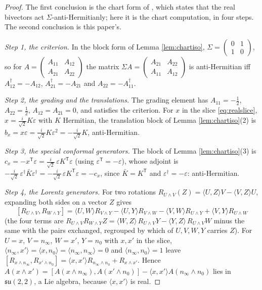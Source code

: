 \documentclass[11pt]{article}
\theoremstyle{definition}
\newcommand{\ip}[2]{\langle #1, #2\rangle}
\begin{document}
\begin{proof}
The first conclusion is the chart form of \cite[Prop.~4.5(2)]{ButlerT9}, which states that the real bivectors act $\Sigma$-anti-Hermitianly; here it is the chart computation, in four steps. The second conclusion is this paper's.

\emph{Step 1, the criterion.} In the block form of Lemma \ref{lem:chartiso}, $\Sigma = \left(\begin{smallmatrix} 0 & 1 \\ 1 & 0\end{smallmatrix}\right)$, so for $A = \left(\begin{smallmatrix} A_{11} & A_{12} \\ A_{21} & A_{22}\end{smallmatrix}\right)$ the matrix $\Sigma A = \left(\begin{smallmatrix} A_{21} & A_{22} \\ A_{11} & A_{12}\end{smallmatrix}\right)$ is anti-Hermitian iff $A_{12}^{\dagger} = -A_{12}$, $A_{21}^{\dagger} = -A_{21}$ and $A_{22} = -A_{11}^{\dagger}$.

\emph{Step 2, the grading and the translations.} The grading element has $A_{11} = -\tfrac12$, $A_{22} = \tfrac12$, $A_{12} = A_{21} = 0$, and satisfies the criterion. For $x$ in the slice \eqref{eq:realslice}, $x = \tfrac{i}{\sqrt2}K\varepsilon$ with $K$ Hermitian, the translation block of Lemma \ref{lem:chartiso}(2) is $b_{x} = x\varepsilon = \tfrac{i}{\sqrt2}K\varepsilon^{2} = -\tfrac{i}{\sqrt2}K$, anti-Hermitian.

\emph{Step 3, the special conformal generators.} The block of Lemma \ref{lem:chartiso}(3) is $c_{x} = -x^{\mathsf T}\varepsilon = \tfrac{i}{\sqrt2}\,\varepsilon K^{\mathsf T}\varepsilon$ (using $\varepsilon^{\mathsf T} = -\varepsilon$), whose adjoint is $-\tfrac{i}{\sqrt2}\,\varepsilon^{\dagger}\bar{K}\varepsilon^{\dagger} = -\tfrac{i}{\sqrt2}\,\varepsilon K^{\mathsf T}\varepsilon = -c_{x}$, since $\bar K = K^{\mathsf T}$ and $\varepsilon^{\dagger} = -\varepsilon$: anti-Hermitian.

\emph{Step 4, the Lorentz generators.} For two rotations $R_{U\wedge V}(Z) = \ip{U}{Z}V - \ip{V}{Z}U$, expanding both sides on a vector $Z$ gives
\[
[R_{U\wedge V}, R_{W\wedge Y}] = \ip{U}{W}R_{V\wedge Y} - \ip{U}{Y}R_{V\wedge W} - \ip{V}{W}R_{U\wedge Y} + \ip{V}{Y}R_{U\wedge W}
\]
(the four terms are $R_{U\wedge V}R_{W\wedge Y}Z = \ip{W}{Z}\,R_{U\wedge V}Y - \ip{Y}{Z}\,R_{U\wedge V}W$ minus the same with the pairs exchanged, regrouped by which of $U, V, W, Y$ carries $Z$). For $U = x$, $V = n_{\infty}$, $W = x'$, $Y = n_{0}$ with $x, x'$ in the slice, $\ip{n_{\infty}}{x'} = \ip{x}{n_{0}} = \ip{n_{\infty}}{n_{\infty}} = 0$ and $\ip{n_{\infty}}{n_{0}} = 1$ leave $[R_{x\wedge n_{\infty}}, R_{x'\wedge n_{0}}] = \ip{x}{x'}R_{n_{\infty}\wedge n_{0}} + R_{x\wedge x'}$. Hence $A(x\wedge x') = [A(x\wedge n_{\infty}), A(x'\wedge n_{0})] - \ip{x}{x'}A(n_{\infty}\wedge n_{0})$ lies in $\mathfrak{su}(2,2)$, a Lie algebra, because $\ip{x}{x'}$ is real.


\end{proof}
\end{document}
